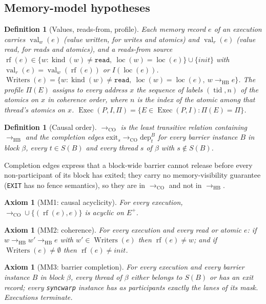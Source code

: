 \documentclass[11pt]{article}
\newtheorem{definition}[theorem]{Definition}
\newtheorem{axiom}[theorem]{Axiom}
\theoremstyle{remark}
\DeclareMathOperator{\tid}{tid}
\DeclareMathOperator{\kind}{kind}
\DeclareMathOperator{\loc}{loc}
\DeclareMathOperator{\Writers}{Writers}
\DeclareMathOperator{\Exec}{Exec}
\DeclareMathOperator{\val}{val}
\DeclareMathOperator{\rf}{rf}
\newcommand{\HB}{\to_{\mathrm{HB}}}
\newcommand{\CO}{\to_{\mathrm{CO}}}
\newcommand{\dep}[2]{\mathrm{dep}^{#2}_{#1}}
\newcommand{\ext}[1]{\mathrm{exit}_{#1}}
\newcommand{\Eplus}{E^{+}}
\begin{document}
\subsection{Memory-model hypotheses}

\begin{definition}[Values, reads-from, profile]\label{def:rf}
Each memory record $e$ of an execution carries $\val_w(e)$ (value written,
for writes and atomics) and $\val_r(e)$ (value read, for reads and atomics),
and a reads-from source $\rf(e)\in\{w:\kind(w)\ne\texttt{read},\ \loc(w)=\loc(e)\}\cup\{\mathit{init}\}$
with $\val_r(e)=\val_w(\rf(e))$ or $I(\loc(e))$.
$\Writers(e)=\{w:\kind(w)\ne\texttt{read},\ \loc(w)=\loc(e),\ w\HB e\}$.
The \emph{profile} $\Pi(E)$ assigns to every address $x$ the sequence of
labels $(\tid,n)$ of the atomics on $x$ in coherence order, where $n$ is the
index of the atomic among that thread's atomics on $x$.
$\Exec(P,I,\Pi)=\{E\in\Exec(P,I):\Pi(E)=\Pi\}$.
\end{definition}

\begin{definition}[Causal order]
$\CO$ is the least transitive relation containing $\HB$ and the \emph{completion
edges} $\ext{s}\CO\dep{t}{B}$ for every barrier instance $B$ in block $\beta$,
every $t\in S(B)$ and every thread $s$ of $\beta$ with $s\notin S(B)$.
\end{definition}

Completion edges express that a block-wide barrier cannot release before every
non-participant of its block has exited; they carry no memory-visibility
guarantee (\texttt{EXIT} has no fence semantics), so they are in $\CO$ and not
in $\HB$.

\begin{axiom}[MM1: causal acyclicity]\label{ax:caus}
For every execution, $\CO\cup\{(\rf(e),e)\}$ is acyclic on $\Eplus$.
\end{axiom}

\begin{axiom}[MM2: coherence]\label{ax:coh}
For every execution and every read or atomic $e$: if $w\HB w'\HB e$ with
$w'\in\Writers(e)$ then $\rf(e)\ne w$; and if $\Writers(e)\ne\emptyset$ then
$\rf(e)\ne\mathit{init}$.
\end{axiom}

\begin{axiom}[MM3: barrier completion]\label{ax:bar}
For every execution and every barrier instance $B$ in block $\beta$, every
thread of $\beta$ either belongs to $S(B)$ or has an exit record; every
\texttt{syncwarp} instance has as participants exactly the lanes of its mask.
Executions terminate.
\end{axiom}
\end{document}
